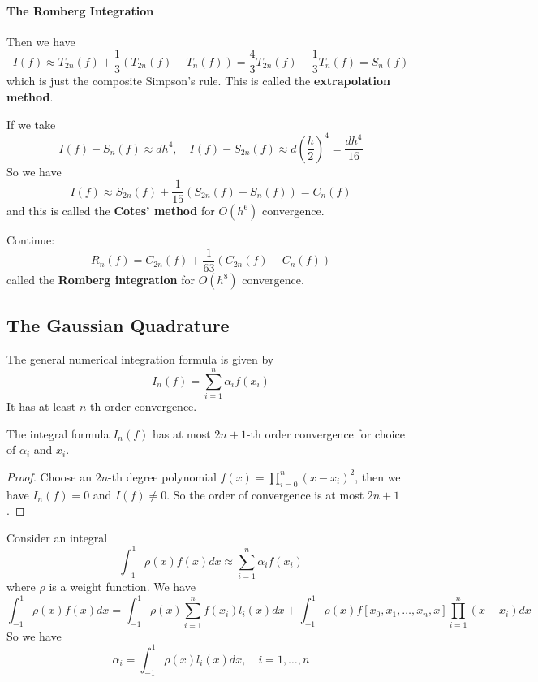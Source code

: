 \documentclass{matharticle}
\begin{document}
\paragraph{The Romberg Integration}

Then we have
\begin{equation}
	I(f) \approx T_{2n}(f) + \frac{1}{3} (T_{2n}(f) - T_n(f)) = \frac{4}{3} T_{2n}(f) - \frac{1}{3} T_n(f) = S_n(f)
\end{equation}
which is just the composite Simpson's rule. This is called the \textbf{extrapolation method}.

If we take
\begin{equation*}
	I(f) - S_n(f) \approx d h^4, \quad I(f) - S_{2n}(f) \approx d \left( \frac{h}{2} \right)^4 = \frac{d h^4}{16}
\end{equation*}
So we have
\begin{equation*}
	I(f) \approx S_{2n}(f) + \frac{1}{15} (S_{2n}(f) - S_n(f)) = C_n(f)
\end{equation*}
and this is called the \textbf{Cotes' method} for $O(h^6)$ convergence.

Continue:
\begin{equation}
	R_n(f) = C_{2n}(f) + \frac{1}{63} (C_{2n}(f) - C_n(f))
\end{equation}
called the \textbf{Romberg integration} for $O(h^8)$ convergence.

\subsection{The Gaussian Quadrature}
The general numerical integration formula is given by
\begin{equation}
	I_n(f) = \sum_{i=1}^{n} \alpha_i f(x_i)
\end{equation}
It has at least $n$-th order convergence.

\begin{theorem}
	The integral formula $I_n(f)$ has at most $2n+1$-th order convergence for choice of $\alpha_i$ and $x_i$.
\end{theorem}
\begin{proof}
	Choose an $2n$-th degree polynomial $f(x) = \prod_{i=0}^{n} (x - x_i)^2$, then we have $I_n(f) = 0$ and $I(f) \neq 0$. So the order of convergence is at most $2n+1$.
\end{proof}

Consider an integral
\begin{equation}
	\int_{-1}^{1} \rho(x) f(x) dx \approx \sum_{i=1}^{n} \alpha_i f(x_i)
\end{equation}
where $\rho$ is a weight function. We have
\begin{equation*}
	\int_{-1}^{1} \rho(x) f(x) dx = \int_{-1}^{1} \rho(x) \sum_{i=1}^{n} f(x_i) l_i(x) dx + \int_{-1}^{1} \rho(x) f[x_0, x_1, \ldots, x_n, x] \prod_{i=1}^{n} (x - x_i) dx
\end{equation*}
So we have
\begin{equation}
	\alpha_i = \int_{-1}^{1} \rho(x) l_i(x) dx, \quad i = 1, \ldots, n
\end{equation}
\end{document}
